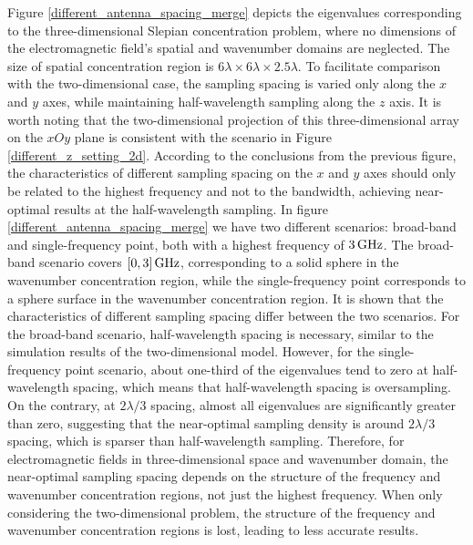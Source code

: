 \documentclass[12pt,draftclsnofoot,journal,onecolumn]{IEEEtran}
\begin{document}
		 Figure \ref{different_antenna_spacing_merge} depicts the eigenvalues corresponding to the three-dimensional Slepian concentration problem, where no dimensions of the electromagnetic field's spatial and wavenumber domains are neglected. The size of spatial concentration region is $6\lambda \times 6\lambda \times 2.5\lambda$. To facilitate comparison with the two-dimensional case, the sampling spacing is varied only along the $x$ and $y$ axes, while maintaining half-wavelength sampling along the $z$ axis. It is worth noting that the two-dimensional projection of this three-dimensional array on the $xOy$ plane is consistent with the scenario in Figure \ref{different_z_setting_2d}. According to the conclusions from the previous figure, the characteristics of different sampling spacing on the $x$ and $y$ axes should only be related to the highest frequency and not to the bandwidth, achieving near-optimal results at the half-wavelength sampling. In figure \ref{different_antenna_spacing_merge} we have two different scenarios: broad-band and single-frequency point, both with a highest frequency of $3\,{\rm GHz}$. The broad-band scenario covers $[0,3]\,{\rm GHz}$, corresponding to a solid sphere in the wavenumber concentration region, while the single-frequency point corresponds to a sphere surface in the wavenumber concentration region. It is shown that the characteristics of different sampling spacing differ between the two scenarios. For the broad-band scenario, half-wavelength spacing is necessary, similar to the simulation results of the two-dimensional model. However, for the single-frequency point scenario, about one-third of the eigenvalues tend to zero at half-wavelength spacing, which means that half-wavelength spacing is oversampling. On the contrary, at $2\lambda/3$ spacing, almost all eigenvalues are significantly greater than zero, suggesting that the near-optimal sampling density is around $2\lambda/3$ spacing, which is sparser than half-wavelength sampling. Therefore, for electromagnetic fields in three-dimensional space and wavenumber domain, the near-optimal sampling spacing depends on the structure of the frequency and wavenumber concentration regions, not just the highest frequency. When only considering the two-dimensional problem, the structure of the frequency and wavenumber concentration regions is lost, leading to less accurate results.
\end{document}

